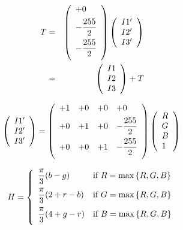\documentclass{article}
\begin{document}
\begin{eqnarray*} T &=& \left( \begin{array}{l} +0 \vspace{.5em} \\ -\dfrac{255}{2} \vspace{.5em} \\ -\dfrac{255}{2} \vspace{.5em} \\ \end{array} \right) \left( \begin{array}{l} I1' \\ I2' \\ I3' \\ \end{array} \right) \\ &=& \left( \begin{array}{l} I1 \\ I2 \\ I3 \\ \end{array} \right) + T \end{eqnarray*}
\pagebreak

\[ \left( \begin{array}{l} I1' \\ I2' \\ I3' \\ \end{array} \right) = \left( \begin{array}{llll} +1 & +0 & +0 & +0 \vspace{.5em} \\ +0 & +1 & +0 & -\dfrac{255}{2} \vspace{.5em} \\ +0 & +0 & +1 & -\dfrac{255}{2} \vspace{.5em} \\ \end{array} \right) \left( \begin{array}{l} R \\ G \\ B \\ 1 \\ \end{array} \right) \\ \]
\pagebreak

\[ H=\left \{ \begin{array}{ll} \dfrac{\pi}{3}(b -g) & \mbox{if}\ R = \max \left\{ R, G, B \right\} \vspace{.5em} \\ \dfrac{\pi}{3}(2 + r - b) & \mbox{if}\ G = \max \left\{ R, G, B \right\} \vspace{.5em} \\ \dfrac{\pi}{3}(4 + g - r) & \mbox{if}\ B = \max \left\{ R, G, B \right\} \vspace{.5em} \\ \end{array} \right. \]
\pagebreak
\end{document}
